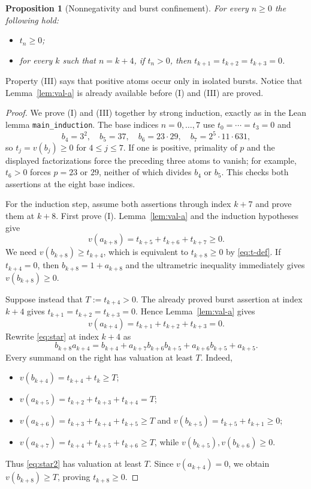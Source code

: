\documentclass[11pt]{article}
\newtheorem{proposition}{Proposition}
\theoremstyle{remark}
\begin{document}
\begin{proposition}[Nonnegativity and burst confinement]\label{prop:atoms}
For every $n\ge0$ the following hold:
\begin{itemize}
\item[\textup{(I)}] $t_n\ge0$;
\item[\textup{(III)}] for every $k$ such that $n=k+4$, if $t_n>0$, then
      $t_{k+1}=t_{k+2}=t_{k+3}=0$.
\end{itemize}
\end{proposition}

Property (III) says that positive atoms occur only in isolated bursts.  Notice
that Lemma~\ref{lem:val-a} is already available before (I) and (III) are proved.

\begin{proof}
We prove (I) and (III) together by strong induction, exactly as in the Lean
lemma \texttt{main\_induction}.  The base indices $n=0,\dots,7$ use
$t_0=\cdots=t_3=0$ and
\[
b_4=3^2,\quad b_5=37,\quad b_6=23\cdot29,\quad b_7=2^5\cdot11\cdot631,
\]
so $t_j=v(b_j)\ge0$ for $4\le j\le7$.  If one is positive, primality of
$p$ and the displayed factorizations force the preceding three atoms to
vanish; for example, $t_6>0$ forces $p=23$ or $29$, neither of which divides
$b_4$ or $b_5$.  This checks both assertions at the eight base indices.

For the induction step, assume both assertions through index $k+7$ and prove
them at $k+8$.  First prove (I).  Lemma~\ref{lem:val-a} and the induction
hypotheses give
\[
v(a_{k+8})=t_{k+5}+t_{k+6}+t_{k+7}\ge0.
\]
We need $v(b_{k+8})\ge t_{k+4}$, which is equivalent to $t_{k+8}\ge0$ by
\eqref{eq:t-def}.  If $t_{k+4}=0$, then
$b_{k+8}=1+a_{k+8}$ and the ultrametric inequality immediately gives
$v(b_{k+8})\ge0$.

Suppose instead that $T:=t_{k+4}>0$.  The already proved burst assertion at
index $k+4$ gives $t_{k+1}=t_{k+2}=t_{k+3}=0$.  Hence
Lemma~\ref{lem:val-a} gives
\[
v(a_{k+4})=t_{k+1}+t_{k+2}+t_{k+3}=0.
\]
Rewrite \eqref{eq:star} at index $k+4$ as
\begin{equation}
b_{k+8}a_{k+4}
=b_{k+4}+a_{k+7}b_{k+6}b_{k+5}
 +a_{k+6}b_{k+5}+a_{k+5}.
\label{eq:star2}
\end{equation}
Every summand on the right has valuation at least $T$.  Indeed,
\begin{itemize}
\item $v(b_{k+4})=t_{k+4}+t_k\ge T$;
\item $v(a_{k+5})=t_{k+2}+t_{k+3}+t_{k+4}=T$;
\item $v(a_{k+6})=t_{k+3}+t_{k+4}+t_{k+5}\ge T$ and
      $v(b_{k+5})=t_{k+5}+t_{k+1}\ge0$;
\item $v(a_{k+7})=t_{k+4}+t_{k+5}+t_{k+6}\ge T$, while
      $v(b_{k+5}),v(b_{k+6})\ge0$.
\end{itemize}
Thus \eqref{eq:star2} has valuation at least $T$.  Since $v(a_{k+4})=0$,
we obtain $v(b_{k+8})\ge T$, proving $t_{k+8}\ge0$.


\end{proof}
\end{document}
